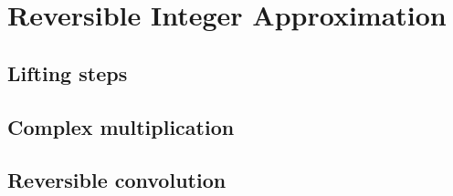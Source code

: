 \section{Reversible Integer Approximation}

\subsection{Lifting steps}

\subsection{Complex multiplication}

\subsection{Reversible convolution} %

